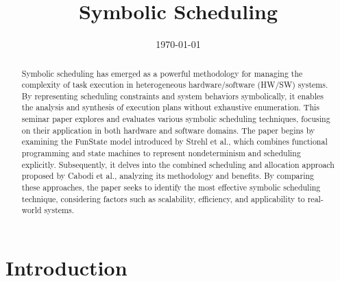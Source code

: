 \documentclass[conference]{IEEEtran}
\title{Symbolic Scheduling}
\author{%
\IEEEauthorblockN{Abu Sayem}
\IEEEauthorblockA{Electronic Engineering\\
Hochschule Hamm-Lippstadt\\
abu.sayem@stud.hshl.de}
}
\date{\today}
\begin{document}
\maketitle

\begin{abstract}
Symbolic scheduling has emerged as a powerful methodology for managing the complexity of task execution in heterogeneous hardware/software (HW/SW) systems. By representing scheduling constraints and system behaviors symbolically, it enables the analysis and synthesis of execution plans without exhaustive enumeration. This seminar paper explores and evaluates various symbolic scheduling techniques, focusing on their application in both hardware and software domains. The paper begins by examining the FunState model introduced by Strehl et al., which combines functional programming and state machines to represent nondeterminism and scheduling explicitly. Subsequently, it delves into the combined scheduling and allocation approach proposed by Cabodi et al., analyzing its methodology and benefits. By comparing these approaches, the paper seeks to identify the most effective symbolic scheduling technique, considering factors such as scalability, efficiency, and applicability to real-world systems.
\end{abstract}

\section{\textbf{Introduction}}
\end{document}
